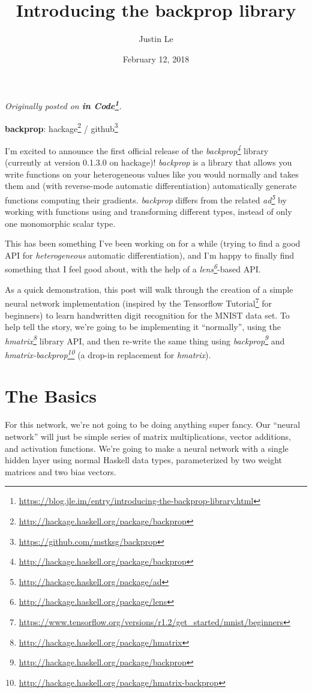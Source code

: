 \documentclass[]{article}
\title{Introducing the backprop library}
\author{Justin Le}
\date{February 12, 2018}
\renewcommand{\href}[2]{#2\footnote{\url{#1}}}
\begin{document}
\maketitle

\emph{Originally posted on
\textbf{\href{https://blog.jle.im/entry/introducing-the-backprop-library.html}{in
Code}}.}

\textbf{backprop}: \href{http://hackage.haskell.org/package/backprop}{hackage} /
\href{https://github.com/mstksg/backprop}{github}

I'm excited to announce the first official release of the
\emph{\href{http://hackage.haskell.org/package/backprop}{backprop}} library
(currently at version 0.1.3.0 on hackage)! \emph{backprop} is a library that
allows you write functions on your heterogeneous values like you would normally
and takes them and (with reverse-mode automatic differentiation) automatically
generate functions computing their gradients. \emph{backprop} differs from the
related \emph{\href{http://hackage.haskell.org/package/ad}{ad}} by working with
functions using and transforming different types, instead of only one
monomorphic scalar type.

This has been something I've been working on for a while (trying to find a good
API for \emph{heterogeneous} automatic differentiation), and I'm happy to
finally find something that I feel good about, with the help of a
\emph{\href{http://hackage.haskell.org/package/lens}{lens}}-based API.

As a quick demonstration, this post will walk through the creation of a simple
neural network implementation (inspired by the
\href{https://www.tensorflow.org/versions/r1.2/get_started/mnist/beginners}{Tensorflow
Tutorial} for beginners) to learn handwritten digit recognition for the MNIST
data set. To help tell the story, we're going to be implementing it
``normally'', using the
\emph{\href{http://hackage.haskell.org/package/hmatrix}{hmatrix}} library API,
and then re-write the same thing using
\emph{\href{http://hackage.haskell.org/package/backprop}{backprop}} and
\emph{\href{http://hackage.haskell.org/package/hmatrix-backprop}{hmatrix-backprop}}
(a drop-in replacement for \emph{hmatrix}).

\hypertarget{the-basics}{%
\section{The Basics}\label{the-basics}}

For this network, we're not going to be doing anything super fancy. Our ``neural
network'' will just be simple series of matrix multiplications, vector
additions, and activation functions. We're going to make a neural network with a
single hidden layer using normal Haskell data types, parameterized by two weight
matrices and two bias vectors.
\end{document}
